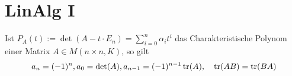 \section{LinAlg I}

    Ist $P_A(t) := \det(A - t \cdot E_n) = \sum_{i = 0}^{n}\alpha_it^i$ das Charakteristische Polynom einer Matrix $A \in M(n\times n,K)$, so gilt
\begin{align*}
    a_n = (-1)^n, a_0 = \det(A), a_{n-1} = (-1)^{n-1} \operatorname{tr}(A), \quad \operatorname{tr}(AB) = \operatorname{tr}(BA)
\end{align*}


